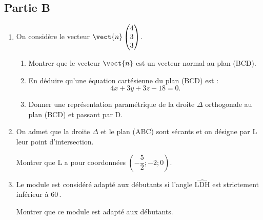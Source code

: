 			\subsection*{Partie B}
		\begin{enumerate}
			\item On considère le vecteur $\vect{n}\begin{pmatrix} 4\\3\\3 \end{pmatrix}$.
			\begin{enumerate}
				\item Montrer que le vecteur $\vect{n}$ est un vecteur normal au plan (BCD).

				\item En déduire qu'une équation cartésienne du plan (BCD) est :
				\[4x+3y+3z-18=0.\]

				\item Donner une représentation paramétrique de la droite $\Delta$ orthogonale au plan (BCD) et passant par D.
			\end{enumerate}


			\item On admet que la droite $\Delta$ et le plan (ABC) sont sécants et on désigne par L leur point d'intersection.

			Montrer que L a pour coordonnées $\left(-\dfrac{5}{2} ; -2 ; 0\right)$.

			\item Le module est considéré adapté aux débutants si l'angle $\widehat{\mathrm{LDH}}$ est strictement inférieur à $60$\,\textdegree{}.

			Montrer que ce module est adapté aux débutants.
		\end{enumerate}
